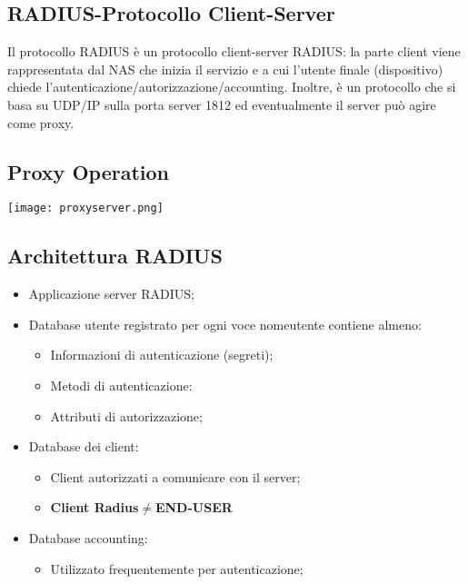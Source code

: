 \documentclass{article}
\theoremstyle{remark}
\begin{document}
\subsection{RADIUS-Protocollo Client-Server}
Il protocollo RADIUS è un protocollo client-server RADIUS: la parte client viene rappresentata dal NAS che inizia il servizio e a cui l'utente finale (dispositivo) chiede l'autenticazione/autorizzazione/accounting. Inoltre, è un protocollo che si basa su UDP/IP sulla porta server 1812 ed eventualmente il server può agire come proxy.
\subsection{Proxy Operation}
\begin{center}
	\texttt{[image: proxyserver.png]}
\end{center}
\subsection{Architettura RADIUS}
\begin{itemize}
	\item Applicazione server RADIUS;
	\item Database utente registrato per ogni voce nomeutente contiene almeno:\begin{itemize}
		      \item Informazioni di autenticazione (segreti);
		      \item Metodi di autenticazione:
		      \item Attributi di autorizzazione;
	      \end{itemize}
	\item Database dei client:\begin{itemize}
		      \item Client autorizzati a comunicare con il server;
		      \item \textbf{Client Radius}$\neq$\textbf{END-USER}

	      \end{itemize}
	\item Database accounting:\begin{itemize}
		      \item Utilizzato frequentemente per autenticazione;
	      \end{itemize}
\end{itemize}
\end{document}
